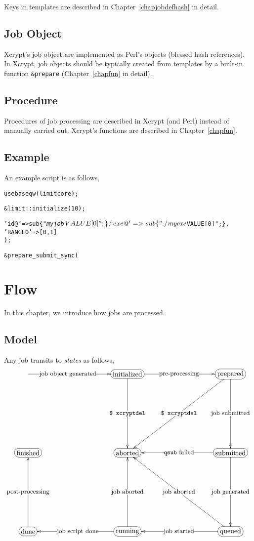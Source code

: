 \documentclass[a4paper,10pt]{report}
\begin{document}
Keys in templates are described in Chapter~\ref{chapjobdefhash} in
detail.

\section{Job Object}

Xcrypt's job object are implemented as Perl's objects (blessed hash
references).  In Xcrypt, job objects should be typically created from
templates by a built-in function \texttt{\&prepare}
(Chapter~\ref{chapfun} in detail).


\section{Procedure}

Procedures of job processing are described in Xcrypt (and Perl)
instead of manually carried out.
Xcrypt's functions are described in Chapter~\ref{chapfun}.

\section{Example}\label{secscriptexample}

An example script is as follows,
\begin{boxnote}
\begin{alltt}
use base qw(limit core);

&limit::initialize(10);

%template = (
 'id@' => sub \{ "\textit{myjob}$VALUE[0]"; \},
 'exe@' => sub \{ "./\textit{myexe} $VALUE[0]"; \},
 'RANGE0' => [0,1]
);

&prepare_submit_sync(%myjob);
\end{alltt}
\end{boxnote}


\chapter{Flow}

In this chapter, we introduce how jobs are processed.

\section{Model}\label{sec:states}

Any job transits to \textit{states} as follows,
\[
\entrymodifiers={+[F-:<10pt>]}
\xymatrix@=100pt{
  *{} \ar[r]|(.4){\txt{\small job object generated}} &
  \txt{initialized} \ar[r]|{\txt{\small pre-processing}} \ar[d]|{\txt{\small \texttt{\$ xcryptdel}}}&
  \txt{prepared} \ar[d]|{\txt{\small job submitted}} \ar[ld]|{\txt{\small \texttt{\$ xcryptdel}}}\\
  \txt{finished} &
  \txt{aborted} &
  \txt{submitted} \ar[d]|{\txt{\small job generated}} \ar[l]|{\txt{\small \texttt{qsub} failed}}\\
  \txt{done} \ar[u]|{\txt{\small post-processing}} &
  \txt{running} \ar[l]|{\txt{\small job script done}} \ar[u]|{\txt{\small job aborted}} &
  \txt{queued} \ar[l]|{\txt{\small job started}} \ar[lu]|{\txt{\small job aborted}}
}
\]
\end{document}
